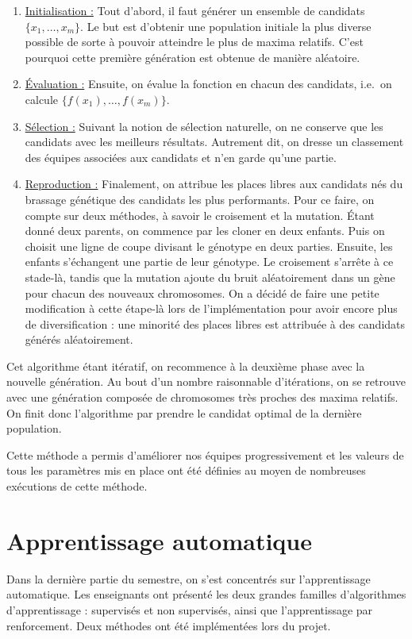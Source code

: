 \documentclass[12pt,a4paper]{article}
\begin{document}
\begin{enumerate}
  \item \underline{Initialisation :} Tout d'abord, il faut g\'en\'erer un 
  ensemble de candidats $\{x_1,\dotsc,x_m\}$. Le but est d'obtenir une 
  population initiale la plus diverse possible de sorte \`a pouvoir atteindre 
le plus de maxima relatifs. C'est pourquoi cette premi\`ere g\'en\'eration est 
obtenue de mani\`ere al\'eatoire.
  \item \underline{\'Evaluation :} Ensuite, on \'evalue la fonction en 
  chacun des candidats, i.e.\ on calcule $\{f(x_1),\dotsc,f(x_m)\}$.
  \item \underline{S\'election :} Suivant la notion de s\'election 
  naturelle, on ne conserve que les candidats avec les meilleurs r\'esultats. 
  Autrement dit, on dresse un classement des \'equipes associ\'ees aux 
  candidats et n'en garde qu'une partie.
  \item \underline{Reproduction :} Finalement, on attribue les places 
  libres aux candidats n\'es du brassage g\'en\'etique des candidats les 
  plus performants. Pour ce faire, on compte sur deux m\'ethodes, \`a savoir le 
  croisement et la mutation. \'Etant donn\'e deux parents, on commence par les 
  cloner en deux enfants. Puis on choisit une ligne de coupe divisant le 
  g\'enotype en deux parties. Ensuite, les enfants s'\'echangent une partie de 
  leur g\'enotype. Le croisement s'arr\^ete \`a ce stade-l\`a, tandis que la 
  mutation ajoute du bruit al\'eatoirement dans un g\`ene pour chacun 
  des nouveaux chromosomes. On a d\'ecid\'e de faire une petite modification 
  \`a cette \'etape-l\`a lors de l'impl\'ementation pour avoir encore plus de 
  diversification : une minorit\'e des places libres est attribu\'ee \`a des 
  candidats g\'en\'er\'es al\'eatoirement.
\end{enumerate}

Cet algorithme \'etant it\'eratif, on recommence \`a la deuxi\`eme phase avec 
la nouvelle g\'en\'eration. Au bout d'un nombre raisonnable d'it\'erations, on 
se retrouve avec une g\'en\'eration compos\'ee de chromosomes tr\`es proches 
des maxima relatifs. On finit donc l'algorithme par prendre le candidat optimal 
de la derni\`ere population.

Cette m\'ethode a permis d'am\'eliorer nos \'equipes progressivement et les 
valeurs de tous les param\`etres mis en place ont \'et\'e d\'efinies au moyen 
de nombreuses ex\'ecutions de cette m\'ethode.

\section{Apprentissage automatique}
Dans la derni\`ere partie du semestre, on s'est concentr\'es sur 
l'apprentissage automatique. Les enseignants ont pr\'esent\'e les deux grandes 
familles d'algorithmes d'apprentissage : supervis\'es et non supervis\'es, ainsi 
que l'apprentissage par renforcement. Deux m\'ethodes ont \'et\'e 
impl\'ement\'ees lors du projet.
\end{document}
